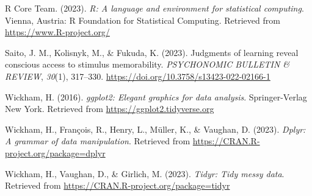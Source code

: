\documentclass[
  man]{apa6}
\newlength{\cslhangindent}
\newlength{\cslentryspacingunit} %
\newenvironment{CSLReferences}[2] %
 {%
  \setlength{\parindent}{0pt}
  \ifodd #1
  \let\oldpar\par
  \def\par{\hangindent=\cslhangindent\oldpar}
  \fi
  \setlength{\parskip}{#2\cslentryspacingunit}
 }%
 {}
\begin{document}
\begin{CSLReferences}{1}{0}
\leavevmode{}%
R Core Team. (2023). \emph{R: A language and environment for statistical computing}. Vienna, Austria: R Foundation for Statistical Computing. Retrieved from \url{https://www.R-project.org/}

\leavevmode{}%
Saito, J. M., Kolisnyk, M., \& Fukuda, K. (2023). Judgments of learning reveal conscious access to stimulus memorability. \emph{PSYCHONOMIC BULLETIN \& REVIEW}, \emph{30}(1), 317--330. \url{https://doi.org/10.3758/s13423-022-02166-1}

\leavevmode{}%
Wickham, H. (2016). \emph{ggplot2: Elegant graphics for data analysis}. Springer-Verlag New York. Retrieved from \url{https://ggplot2.tidyverse.org}

\leavevmode{}%
Wickham, H., François, R., Henry, L., Müller, K., \& Vaughan, D. (2023). \emph{Dplyr: A grammar of data manipulation}. Retrieved from \url{https://CRAN.R-project.org/package=dplyr}

\leavevmode{}%
Wickham, H., Vaughan, D., \& Girlich, M. (2023). \emph{Tidyr: Tidy messy data}. Retrieved from \url{https://CRAN.R-project.org/package=tidyr}

\end{CSLReferences}
\end{document}
